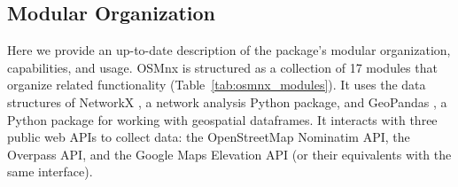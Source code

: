 \documentclass[12pt,letterpaper]{article} %
\begin{document}
\subsection{Modular Organization}\label{sec:modular_organization}

Here we provide an up-to-date description of the package's modular organization, capabilities, and usage. OSMnx is structured as a collection of 17 modules that organize related functionality (Table~\ref{tab:osmnx_modules}). It uses the data structures of NetworkX \citep{hagberg_exploring_2008}, a network analysis Python package, and GeoPandas \citep{van_den_bossche_geopandasgeopandas_2024}, a Python package for working with geospatial dataframes. It interacts with three public web APIs to collect data: the OpenStreetMap Nominatim API, the Overpass API, and the Google Maps Elevation API (or their equivalents with the same interface).
\end{document}
